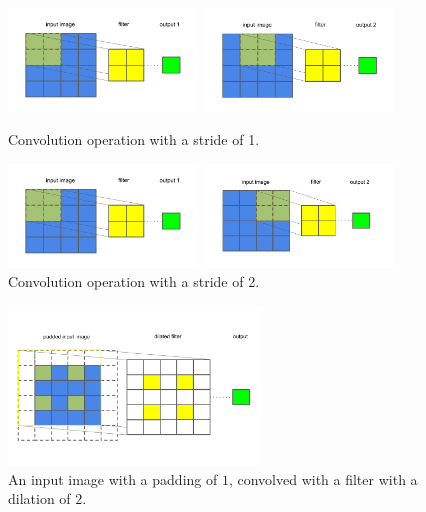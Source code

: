 \begin{figure}[H]
	\parbox{.5\linewidth}{
   		\centering
    		\includegraphics[width=0.45\textwidth, height=0.2\textwidth]{convolution1}
		}
	\hfill
	\parbox{.5\linewidth}{
   		\centering
    		\includegraphics[width=0.45\textwidth, height=0.2\textwidth]{convolution2}
		}
	\caption{Convolution operation with a stride of 1.}
	
	\parbox{.5\linewidth}{
   		\centering
    		\includegraphics[width=0.45\textwidth, height=0.2\textwidth]{convolution1}
		}
	\hfill
	\parbox{.5\linewidth}{
   		\centering
    		\includegraphics[width=0.45\textwidth, height=0.2\textwidth]{stride_of_2}
		}
	\caption{Convolution operation with a stride of 2.}
\end{figure}

\begin{figure}[H]
   	\centering
    	\includegraphics[width=0.6\textwidth, height=0.3\textwidth]{padding_and_dilation}
	\caption{An input image with a padding of $ 1 $, convolved with a filter with a dilation of $ 2 $.}
\end{figure}

